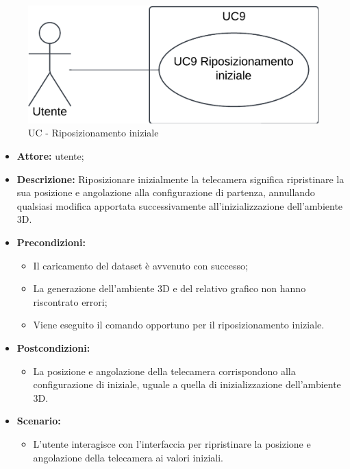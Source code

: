 \begin{figure}[h!]\centering
    \includegraphics[scale=0.7]{template/images/UC9.png}
    \caption{UC - Riposizionamento iniziale}
\end{figure}
\begin{itemize}    
    \item \textbf{Attore:} utente;
    \item \textbf{Descrizione:} Riposizionare inizialmente la telecamera significa ripristinare la sua posizione e angolazione alla configurazione di partenza, annullando qualsiasi modifica apportata successivamente all'inizializzazione dell'ambiente 3D.
    \item \textbf{Precondizioni:}    
        \begin{itemize}
            \item Il caricamento del dataset è avvenuto con successo;
            \item La generazione dell'ambiente 3D e del relativo grafico non hanno riscontrato errori;
            \item Viene eseguito il comando opportuno per il riposizionamento iniziale.
        \end{itemize}    
    \item \textbf{Postcondizioni:}
        \begin{itemize}
            \item La posizione e angolazione della telecamera corrispondono alla configurazione di iniziale, uguale a quella di inizializzazione dell'ambiente 3D.
        \end{itemize}    
    \item \textbf{Scenario:} 
        \begin{itemize}
            \item L'utente interagisce con l'interfaccia per ripristinare la posizione e angolazione della telecamera ai valori iniziali.
        \end{itemize}
\end{itemize}



